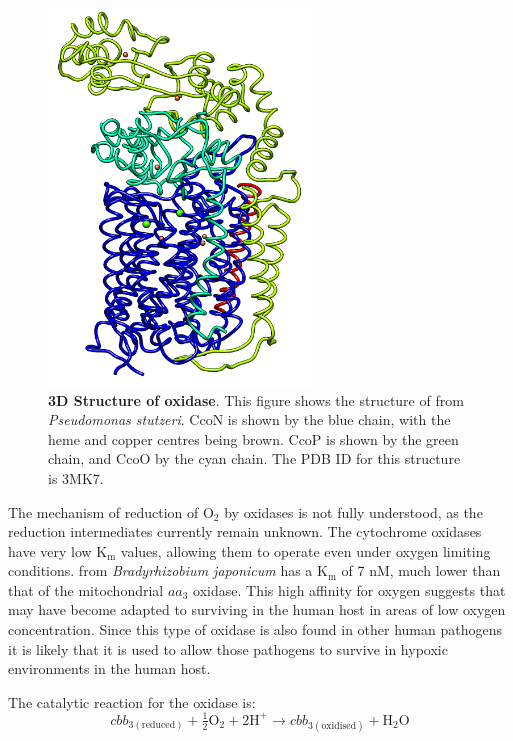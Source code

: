 \begin{figure}[tbp]
  \begin{center}
    \includegraphics[height=10cm]{01-introduction/data/cbb3_struct.png}
  \end{center}
  \caption[{3D Structure of \cbbthree{} oxidase}.]{{\bf 3D Structure of \cbbthree{} oxidase}. This figure shows the structure of \cbbthree{} from \textit{Pseudomonas stutzeri}\cite{Buschmann2010}. CcoN is shown by the blue chain, with the heme and copper centres being brown. CcoP is shown by the green chain, and CcoO by the cyan chain. The PDB ID for this structure is 3MK7.
  \label{fig:cbb3_struct}}
\end{figure}

The mechanism of reduction of $\mathrm{O}_2$ by \cbbthree{} oxidases is not fully understood, as the reduction intermediates currently remain unknown\cite{Huang2010}. The cytochrome \cbbthree{} oxidases have very low $\mathrm{K}_\mathrm{m}$ values, allowing them to operate even under oxygen limiting conditions. \cbbthree{} from \textit{Bradyrhizobium japonicum} has a $\mathrm{K}_\mathrm{m}$ of 7 nM, much lower than that of the mitochondrial $aa_3$ oxidase\cite{Zufferey1996}. This high affinity for oxygen suggests that \Nm{} may have become adapted to surviving in the human host in areas of low oxygen concentration. Since this type of oxidase is also found in other human pathogens it is likely that it is used to allow those pathogens to survive in hypoxic environments in the human host\cite{Preisig1996a}.

The catalytic reaction for the \cbbthree{} oxidase is:
\begin{equation}
cbb_{3\mathrm{(reduced)}} + \tfrac{1}{2}\mathrm{O}_2 + 2\mathrm{H}^+ \rightarrow cbb_{3\mathrm{(oxidised)}} + \mathrm{H}_2\mathrm{O}
\end{equation}

